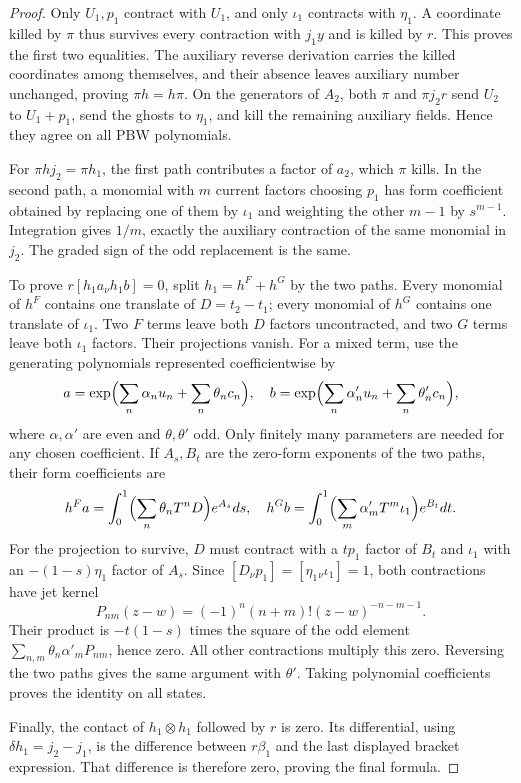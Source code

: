 \begin{proof}
Only $U_1,p_1$ contract with $U_1$, and only $\iota_1$
contracts with $\eta_1$. A coordinate killed by $\pi$ thus
survives every contraction with $j_1y$ and is killed by $r$.
This proves the first two equalities. The auxiliary reverse
derivation carries the killed coordinates among themselves,
and their absence leaves auxiliary number unchanged, proving
$\pi h=h\pi$. On the generators of $A_2$, both $\pi$ and
$\pi j_2r$ send $U_2$ to $U_1+p_1$, send the ghosts to
$\eta_1$, and kill the remaining auxiliary fields. Hence
they agree on all PBW polynomials.

For $\pi hj_2=\pi h_1$, the first path contributes a factor
of $a_2$, which $\pi$ kills. In the second path, a monomial
with $m$ current factors choosing $p_1$ has form coefficient
obtained by replacing one of them by $\iota_1$ and weighting
the other $m-1$ by $s^{m-1}$. Integration gives $1/m$,
exactly the auxiliary contraction of the same monomial in
$j_2$. The graded sign of the odd replacement is the same.

To prove $r[h_1a_\nu h_1b]=0$, split $h_1=h^F+h^G$ by
the two paths. Every monomial of $h^F$ contains one translate
of $D=t_2-t_1$; every monomial of $h^G$ contains one translate
of $\iota_1$. Two $F$ terms leave both $D$ factors uncontracted,
and two $G$ terms leave both $\iota_1$ factors. Their
projections vanish. For a mixed term, use the generating
polynomials represented coefficientwise by
\[
 a=\exp\Bigl(\sum_n\alpha_nu_n+\sum_n\theta_nc_n\Bigr),
 \quad
 b=\exp\Bigl(\sum_n\alpha'_nu_n+\sum_n\theta'_nc_n\Bigr),
\]
where $\alpha,\alpha'$ are even and $\theta,\theta'$ odd.
Only finitely many parameters are needed for any chosen
coefficient. If $A_s,B_t$ are the zero-form exponents of the
two paths, their form coefficients are
\[
 h^Fa=\int_0^1\Bigl(\sum_n\theta_nT^nD\Bigr)e^{A_s}ds,
 \quad
 h^Gb=\int_0^1\Bigl(\sum_m\alpha'_mT^m\iota_1\Bigr)e^{B_t}dt.
\]
For the projection to survive, $D$ must contract with a
$tp_1$ factor of $B_t$ and $\iota_1$ with an
$-(1-s)\eta_1$ factor of $A_s$. Since
$[D_\nu p_1]=[\eta_1{}_\nu\iota_1]=1$, both contractions
have jet kernel
\[
 P_{nm}(z-w)=(-1)^n(n+m)!(z-w)^{-n-m-1}.
\]
Their product is $-t(1-s)$ times the square of the odd
element $\sum_{n,m}\theta_n\alpha'_mP_{nm}$, hence zero.
All other contractions multiply this zero. Reversing the
two paths gives the same argument with $\theta'$.
Taking polynomial coefficients proves the identity on all
states.

Finally, the contact of $h_1\otimes h_1$ followed by $r$
is zero. Its differential, using
$\delta h_1=j_2-j_1$, is the difference between
$r\beta_1$ and the last displayed bracket expression.
That difference is therefore zero, proving the final formula.
\end{proof}

